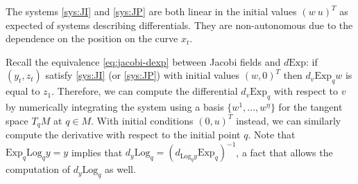 \documentclass[final]{svjour3}
\newcommand{\tm}{d}
\newcommand{\Exp}{\mathrm{Exp}}
\newcommand{\Log}{\mathrm{Log}}
\begin{document}
The systems \eqref{sys:JI} and \eqref{sys:JP} are both linear in the initial values $(w\ u)^T$ 
as expected of systems describing differentials. They are non-autonomous due to the
dependence on the position on the curve $x_t$.

Recall the equivalence \eqref{eq:jacobi-dexp} between Jacobi fields 
and $\tm\Exp$: if $(y_t,z_t)$ satisfy \eqref{sys:JI}
    (or \eqref{sys:JP}) with initial values $(w,0)^T$ then $\tm_v\Exp_q w$ is
    equal to $z_1$.
Therefore, we can compute the differential $\tm_v\Exp_q$ with respect to $v$ by
numerically integrating the system using a
basis $\{w^1,\ldots,w^\eta\}$ for the tangent space $T_qM$ at $q\in M$. With
initial conditions $(0,u)^T$ instead, we can similarly compute the derivative
with respect to the initial point $q$. Note 
that $\Exp_q\Log_q y=y$
implies that $\tm_y\Log_q=(\tm_{\Log_qy}\Exp_q)^{-1}$, a fact that allows the
computation of $\tm_y\Log_q$ as well.
\end{document}
